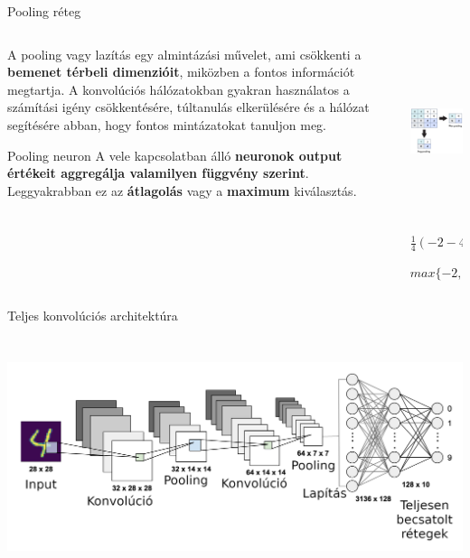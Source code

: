 \documentclass[english, aspectratio=169]{beamer}
\begin{document}
\begin{frame}{Pooling réteg}
	\begin{columns}
		\begin{column}{.5\textwidth}
			A pooling vagy lazítás egy almintázási művelet, ami csökkenti a \textbf{bemenet térbeli dimenzióit}, miközben a fontos információt megtartja. A konvolúciós hálózatokban gyakran használatos a számítási igény csökkentésére, túltanulás elkerülésére és a hálózat segítésére abban, hogy fontos mintázatokat tanuljon meg.\par\smallskip
			\begin{block}{Pooling neuron}
				A vele kapcsolatban álló \textbf{neuronok output értékeit aggregálja valamilyen függvény szerint}. Leggyakrabban ez az \textbf{átlagolás} vagy a \textbf{maximum} kiválasztás.
			\end{block}
		\end{column}
		\begin{column}{.5\textwidth}
			\begin{center}
				\includegraphics[height=5cm, width=7cm, keepaspectratio]{images/dl_6.png}
			\end{center}
			$\frac{1}{4}(-2 -4 +14 -11)=-1$\par\smallskip
			$max\{-2, -4, 14, -11\}=14$
		\end{column}
	\end{columns}
\end{frame}

\begin{frame}{Teljes konvolúciós architektúra}
	\begin{center}
		\includegraphics[height=7cm, width=14cm, keepaspectratio]{images/dl_7.png}
	\end{center}
\end{frame}
\end{document}
